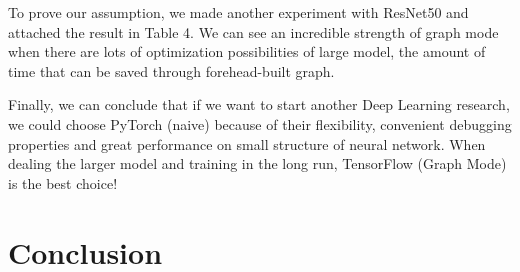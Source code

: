 \documentclass[12pt,twocolumn,letterpaper]{extarticle}
\begin{document}
To prove our assumption, we made another experiment with ResNet50 and attached the result in Table 4. We can see an incredible strength of graph mode when there are lots of optimization possibilities of large model, the amount of time that can be saved through forehead-built graph.

Finally, we can conclude that if we want to start another Deep Learning research, we could choose PyTorch (naive) because of their flexibility, convenient debugging properties and great performance on small structure of neural network. When dealing the larger model and training in the long run, TensorFlow (Graph Mode) is the best choice!

\begin{table}[t]
    \centering
    \caption{Experiment results.}\label{tab:exp-1}
\end{table}


\begin{table}[t]
    \centering
    \caption{Experiment results.}\label{tab:exp-1}
\end{table}

\section{Conclusion} \label{sec-conclusion}
\end{document}
